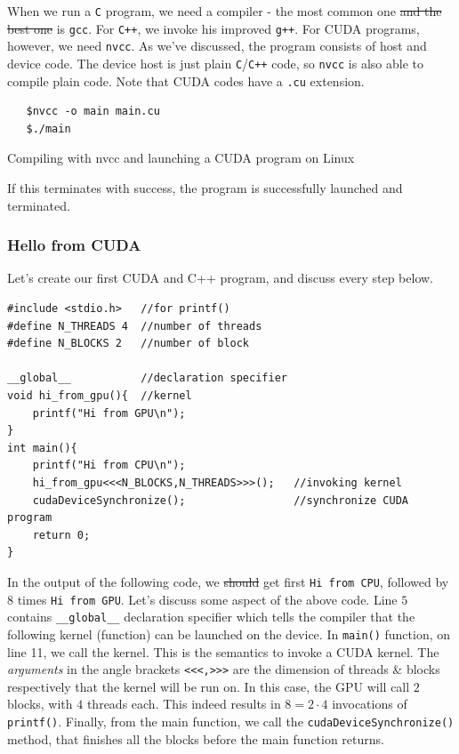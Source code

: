 \documentclass[12pt]{article}
\begin{document}
When we run a \verb|C| program, we need a compiler - the most common one \sout{and the best one} is \verb|gcc|. For \verb|C++|, 
we invoke his improved \verb|g++|. For CUDA programs, however, we need \verb|nvcc|. As we've discussed, the program 
consists of host and device code. The device host is just plain \verb|C|/\verb|C++| code, so \verb|nvcc| is also able 
to compile plain code. Note that CUDA codes have a \verb|.cu| extension.

\begin{listing}[!ht]
\begin{verbatim}
   $nvcc -o main main.cu
   $./main
\end{verbatim}
\vspace{-0.7cm}
\caption{Compiling with nvcc and launching a CUDA program on Linux}
\label{nvcc_cuda}
\end{listing}

\vspace{-0.4cm}
If this terminates with success, the program is successfully launched and terminated. 

\subsubsection{Hello from CUDA}
Let's create our first CUDA and C++ program, and discuss every step below. 
\begin{verbatim}
#include <stdio.h>   //for printf()
#define N_THREADS 4  //number of threads
#define N_BLOCKS 2   //number of block

__global__           //declaration specifier 
void hi_from_gpu(){  //kernel
    printf("Hi from GPU\n");
}
int main(){
    printf("Hi from CPU\n");
    hi_from_gpu<<<N_BLOCKS,N_THREADS>>>();   //invoking kernel
    cudaDeviceSynchronize();                 //synchronize CUDA program
    return 0;
}
\end{verbatim}

In the output of the following code, we \sout{should} get first \verb|Hi from CPU|, 
followed by 8 times \verb|Hi from GPU|. Let's discuss some aspect of the above code.
Line $5$ contains \verb|__global__| declaration specifier which tells 
the compiler that the following kernel (function) can be launched on the device.
In \verb|main()| function, on line 11, we call the kernel. This is the semantics to 
invoke a CUDA kernel. The \textit{arguments} in the angle brackets \verb|<<<,>>>| 
are the dimension of threads \& blocks respectively that the kernel will be run on. In this case, 
the GPU will call $2$ blocks, with $4$ threads each. This indeed results in 
$8 = 2\cdot 4$ invocations of \verb|printf()|. Finally, from the main function, we call 
the \verb|cudaDeviceSynchronize()| method, that finishes all the blocks before the main 
function returns.
\end{document}
